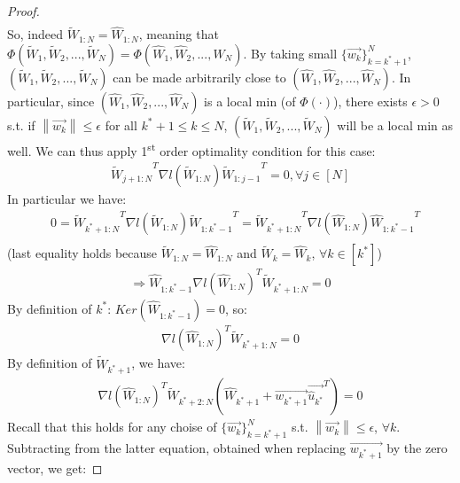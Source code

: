 \documentclass[12pt]{article}
\newcommand{\norm}[1]{\left\| #1 \right\|}
\begin{document}
\begin{proof}
\begin{align*}
	    \end{align*}
	    So, indeed ${\widetilde{W}_{1:N}} = {\widehat{W}_{1:N}}$,
	    meaning that $\Phi({\widetilde{W}_1}, {\widetilde{W}_2}, ..., {\widetilde{W}_N}) = \Phi({\widehat{W}_1}, {\widehat{W}_2}, ..., {\widehat{W}_N})$.
	    By taking small $\{\overrightarrow{w_k}\}_{k=k^\ast+1}^N$, $({\widetilde{W}_1}, {\widetilde{W}_2}, ..., {\widetilde{W}_N})$ can be made arbitrarily close to $({\widehat{W}_1}, {\widehat{W}_2}, ..., {\widehat{W}_N})$.
	    In particular, since $({\widehat{W}_1}, {\widehat{W}_2}, ..., {\widehat{W}_N})$ is a local min (of $\Phi(\cdot)$), there exists $\epsilon > 0$ s.t. if $\norm{\overrightarrow{w_k}} \leq \epsilon$ for all $k^\ast + 1 \leq k \leq N$, $({\widetilde{W}_1}, {\widetilde{W}_2}, ..., {\widetilde{W}_N})$ will be a local min as well. We can thus apply 1\textsuperscript{st} order optimality condition for this case:
	    \begin{align*}
	        {\widetilde{W}_{j+1:N}}^T \nabla{l({\widetilde{W}_{1:N}})} {\widetilde{W}_{1:j-1}}^T = 0, \forall j \in [N]
	    \end{align*}
	    In particular we have:
	    \begin{align*}
	        & 0 = {\widetilde{W}_{k^\ast+1:N}}^T \nabla{l({\widetilde{W}_{1:N}})} {\widetilde{W}_{1:k^\ast-1}}^T = {\widetilde{W}_{k^\ast+1:N}}^T \nabla{l({\widehat{W}_{1:N}})} {\widehat{W}_{1:k^\ast-1}}^T \\
	    \end{align*}
	    (last equality holds because ${\widetilde{W}_{1:N}} = {\widehat{W}_{1:N}}$ and ${\widetilde{W}_k} = {\widehat{W}_k}$, $\forall k \in [k^\ast]$)
	    \begin{align*}
	        \Longrightarrow {\widehat{W}_{1:k^\ast-1}} \nabla{l({\widehat{W}_{1:N}})}^T {\widetilde{W}_{k^\ast+1:N}} = 0
	    \end{align*}
	    By definition of $k^\ast$: $Ker({\widehat{W}_{1:k^\ast-1}}) = 0$, so:
	    \begin{align*}
	        \nabla{l({\widehat{W}_{1:N}})}^T {\widetilde{W}_{k^\ast+1:N}} = 0
	    \end{align*}
	    By definition of ${\widetilde{W}_{k^\ast+1}}$, we have:
	    \begin{align*}
	        \nabla{l({{\widehat{W}}_{1:N}})}^T {\widetilde{W}_{k^\ast+2:N}} ({\widehat{W}_{k^\ast + 1}} + \overrightarrow{w_{k^\ast+1}} {\overrightarrow{\widehat{u}_{k^\ast}}}^T) = 0
	    \end{align*}
	    Recall that this holds for any choise of $\{\overrightarrow{w_k}\}_{k=k^\ast+1}^N$ s.t. $\norm{\overrightarrow{w_k}} \leq \epsilon$, $\forall{k}$. Subtracting from the latter equation, obtained when replacing $\overrightarrow{w_{k^\ast+1}}$ by the zero vector, we get:

\end{proof}
\end{document}
